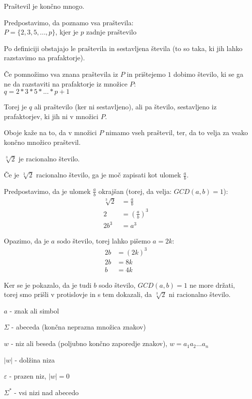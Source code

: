 \begin{primeri}
\item Praštevil je končno mnogo.
	\begin{items}
	\item Predpostavimo, da poznamo vsa praštevila:\\
		$P = \{2,3,5,...,p\}$, kjer je $p$ zadnje praštevilo 
	\item Po definiciji obstajajo le praštevila in sestavljena števila (to so taka, ki jih lahko razstavimo na prafaktorje). 
	\item Če pomnožimo vsa znana praštevila iz $P$ in prištejemo $1$ dobimo število, ki se ga ne da razstaviti na prafaktorje iz množice $P$:\\
		$q = 2 * 3 * 5 * ... * p + 1$
	\item Torej je $q$ ali praštevilo (ker ni sestavljeno), ali pa število, sestavljeno iz prafaktorjev, ki jih ni v množici $P$.
	\item Oboje kaže na to, da v množici $P$ nimamo vseh praštevil, ter, da to velja za vsako končno množico praštevil.
	\end{items}
\item $\sqrt[3]{2}$ je racionalno število.
	\begin{items}
	\item Če je $\sqrt[3]{2}$ racionalno število, ga je moč zapisati kot ulomek $\frac{a}{b}$.
	\item Predpostavimo, da je ulomek $\frac{a}{b}$ okrajšan (torej, da velja: $GCD(a,b)=1$):
		\begin{align*}
		\sqrt[3]{2} &= \frac{a}{b}\\
		2 &= \left( \frac{a}{b} \right)^3\\
		2b^3 &= a^3
		\end{align*}
	\item Opazimo, da je $a$ sodo število, torej lahko pišemo $a = 2k$:
		\begin{align*}
		2b &= \left( 2k\right)^3\\
		2b &= 8k\\
		b &= 4k
		\end{align*}
	\item Ker se je pokazalo, da je tudi $b$ sodo število, $GCD(a,b)=1$ ne more držati, torej smo prišli v protislovje in s tem dokazali, da $\sqrt[3]{2}$ ni racionalno število.
	\end{items}
\end{primeri}
\begin{items}
\item $a$ - znak ali simbol
\item $\Sigma$ - abeceda (končna neprazna množica znakov)
\item $w$ - niz ali beseda (poljubno končno zaporedje znakov), $w=a_1a_2 \ldots a_n$
\item $|w|$ - dolžina niza
\item $\varepsilon$ - prazen niz, $|w|=0$
\item $\Sigma^*$ - vsi nizi nad abecedo
\end{items}

